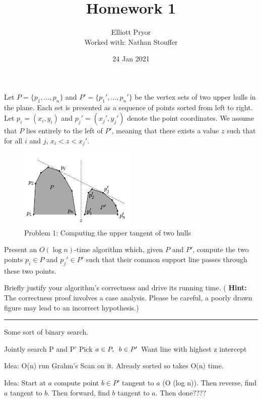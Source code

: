 \documentclass[11pt]{article}
\title{Homework 1}
\author{Elliott Pryor\\
Worked with: Nathan Stouffer}
\date{24 Jan 2021}
\begin{document}
\maketitle

Let $P = \{ p_1, \ldots, p_n \}$ and $P' = \{ p_1', \ldots, p_n' \}$ be the
vertex sets of two upper hulls in the plane.  Each set is presented as a
sequence of points sorted from left to right.  Let $p_i = (x_i, y_i)$ and $p_j'
= (x_j', y_j')$ denote the point coordinates.  We assume that $P$ lies entirely
to the left of $P'$, meaning that there exists a value $z$ such that for all
$i$ and $j$, $x_i < z < x_j'$.

\begin{figure}[h]
    \centering
    \includegraphics[width=0.5\textwidth]{tangents}
    \caption{Problem 1: Computing the upper tangent of two hulls}
\end{figure}

Present an $O(\log n)$-time algorithm which, given $P$ and $P'$, compute the two
points $p_i \in P$ and $p_j' \in P'$ such that their common support line passes
through these two points.

Briefly justify your algorithm's correctness and drive its running time.  ({\bf
Hint:} The correctness proof involves a case analysis.  Please be careful, a
poorly drawn figure may lead to an incorrect hypothesis.)
\hrule

Some sort of binary search. 

Jointly search P and P'
Pick $a \in P, \sp b \in P'$
Want line with highest z intercept

Idea: O(n) run Grahm's Scan on it. Already sorted so takes O(n) time.

Idea: Start at $a$ compute point $b \in P'$ tangent to $a$ (O (log n)). 
Then reverse, find $a$ tangent to $b$. Then forward, find $b$ tangent to $a$. Then done????
\end{document}
